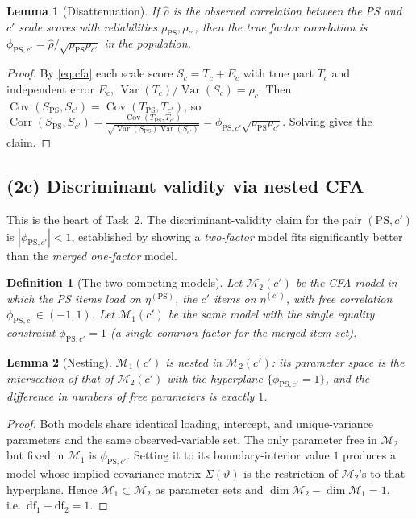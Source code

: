 \documentclass{amsart}
\newtheorem{lemma}{Lemma}
\newtheorem{definition}{Definition}
\theoremstyle{remark}
\begin{document}
\begin{lemma}[Disattenuation]\label{lem:disatt}
If $\hat\rho$ is the observed correlation between the PS and $c'$ \emph{scale
scores} with reliabilities $\rho_{\mathrm{PS}},\rho_{c'}$, then the true
factor correlation is $\phi_{\mathrm{PS},c'}=\hat\rho/\sqrt{\rho_{\mathrm{PS}}\rho_{c'}}$
in the population.
\end{lemma}
\begin{proof}
By \eqref{eq:cfa} each scale score $S_c=T_c+E_c$ with true part $T_c$ and
independent error $E_c$, $\operatorname{Var}(T_c)/\operatorname{Var}(S_c)=\rho_c$. Then
$\operatorname{Cov}(S_{\mathrm{PS}},S_{c'})=\operatorname{Cov}(T_{\mathrm{PS}},T_{c'})$, so
$\operatorname{Corr}(S_{\mathrm{PS}},S_{c'})=\frac{\operatorname{Cov}(T_{\mathrm{PS}},T_{c'})}{\sqrt{\operatorname{Var}(S_{\mathrm{PS}})\operatorname{Var}(S_{c'})}}
=\phi_{\mathrm{PS},c'}\sqrt{\rho_{\mathrm{PS}}\rho_{c'}}$. Solving gives the claim. \end{proof}

\subsection{(2c) Discriminant validity via nested CFA}\label{sec:disc}
This is the heart of Task~2. The discriminant-validity claim for the pair
$(\mathrm{PS},c')$ is $|\phi_{\mathrm{PS},c'}|<1$, established by showing a
\emph{two-factor} model fits significantly better than the \emph{merged
one-factor} model.

\begin{definition}[The two competing models]
Let $\mathcal M_2(c')$ be the CFA model in which the PS items load on $\eta^{(\mathrm{PS})}$,
the $c'$ items on $\eta^{(c')}$, with free correlation $\phi_{\mathrm{PS},c'}\in(-1,1)$.
Let $\mathcal M_1(c')$ be the same model with the single equality constraint
$\phi_{\mathrm{PS},c'}=1$ (a single common factor for the merged item set).
\end{definition}

\begin{lemma}[Nesting]\label{lem:nest}
$\mathcal M_1(c')$ is nested in $\mathcal M_2(c')$: its parameter space is the
intersection of that of $\mathcal M_2(c')$ with the hyperplane
$\{\phi_{\mathrm{PS},c'}=1\}$, and the difference in numbers of free parameters is
exactly $1$.
\end{lemma}
\begin{proof}
Both models share identical loading, intercept, and unique-variance parameters and
the same observed-variable set. The only parameter free in $\mathcal M_2$ but fixed
in $\mathcal M_1$ is $\phi_{\mathrm{PS},c'}$. Setting it to its boundary-interior
value $1$ produces a model whose implied covariance matrix
$\Sigma(\vartheta)$ is the restriction of $\mathcal M_2$'s to that hyperplane.
Hence $\mathcal M_1\subset\mathcal M_2$ as parameter sets and
$\dim\mathcal M_2-\dim\mathcal M_1=1$, i.e.\ $\mathrm{df}_1-\mathrm{df}_2=1$. \end{proof}
\end{document}
